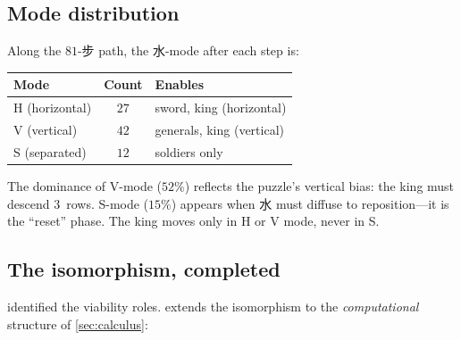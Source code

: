 \subsection*{Mode distribution}

\begin{proposition}\label{prop:modes}
Along the $81$-步 path, the 水-mode after each step is:
\begin{center}
\small
\begin{tabular}{@{}lcl@{}}
\toprule
\textbf{Mode} & \textbf{Count} & \textbf{Enables} \\
\midrule
H (horizontal) & $27$ & sword, king (horizontal) \\
V (vertical)   & $42$ & generals, king (vertical) \\
S (separated)  & $12$ & soldiers only \\
\bottomrule
\end{tabular}
\end{center}
The dominance of V-mode ($52\%$) reflects the
puzzle's vertical bias: the king must descend $3$~rows.
S-mode ($15\%$) appears when 水 must diffuse to
reposition---it is the ``reset'' phase.
The king moves only in H or V mode, never in S\@.
\end{proposition}

\subsection*{The isomorphism, completed}

 identified the viability roles.
 extends the isomorphism to the
\emph{computational} structure of \cref{sec:calculus}:

